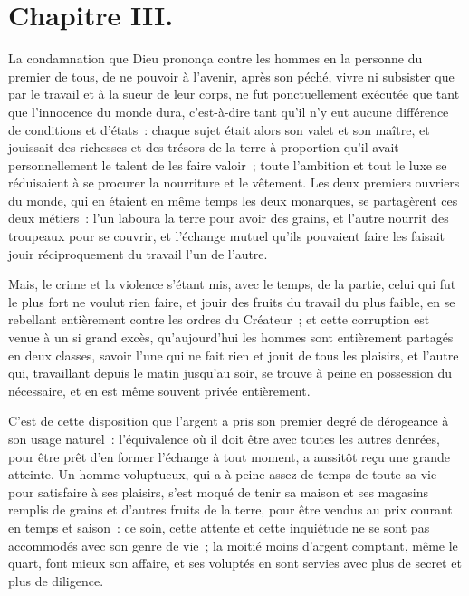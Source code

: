 \documentclass[french,twoside]{book} %
\begin{document}
\section[{Chapitre III.}]{Chapitre III.}
\noindent La condamnation que Dieu prononça contre les hommes en la personne du premier de tous, de ne pouvoir à l’avenir, après son péché, vivre ni subsister que par le travail et à la sueur de leur corps, ne fut ponctuellement exécutée que tant que l’innocence du monde dura, c’est-à-dire tant qu’il n’y eut aucune différence de conditions et d’états : chaque sujet était alors son valet et son maître, et jouissait des richesses et des trésors de la terre à proportion qu’il avait personnellement le talent de les faire valoir ; toute l’ambition et tout le luxe se réduisaient à se procurer la nourriture et le vêtement. Les deux premiers ouvriers du monde, qui en étaient en même temps les deux monarques, se partagèrent ces deux métiers : l’un laboura la terre pour avoir des grains, et l’autre nourrit des troupeaux pour se couvrir, et l’échange mutuel qu’ils pouvaient faire les faisait jouir réciproquement du travail l’un de l’autre.\par
Mais, le crime et la violence s’étant mis, avec le temps, de la partie, celui qui fut le plus fort ne voulut rien faire, et jouir des fruits du travail du plus faible, en se rebellant entièrement contre les ordres du Créateur ; et cette corruption est venue à un si grand excès, qu’aujourd’hui les hommes sont entièrement partagés en deux classes, savoir l’une qui ne fait rien et jouit de tous les plaisirs, et l’autre qui, travaillant depuis le matin jusqu’au soir, se trouve à peine en possession du nécessaire, et en est même souvent privée entièrement.\par
C’est de cette disposition que l’argent a pris son premier degré de dérogeance à son usage naturel : l’équivalence où il doit être avec toutes les autres denrées, pour être prêt d’en former l’échange à tout moment, a aussitôt reçu une grande atteinte. Un homme voluptueux, qui a à peine assez de temps de toute sa vie pour satisfaire à ses plaisirs, s’est moqué de tenir sa maison et ses magasins remplis de grains et d’autres fruits de la terre, pour être vendus au prix courant en temps et saison : ce soin, cette attente et cette inquiétude ne se sont pas accommodés avec son genre de vie ; la moitié moins d’argent comptant, même le quart, font mieux son affaire, et ses voluptés en sont servies avec plus de secret et plus de diligence.\par
\end{document}
